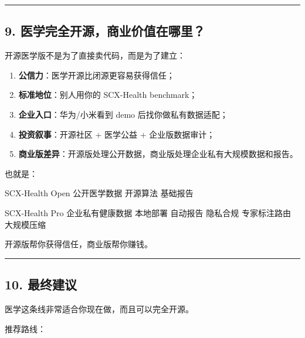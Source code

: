 \documentclass[
  12pt,
]{ctexart}
\newenvironment{Shaded}{}{}
\newcommand{\NormalTok}[1]{#1}
\providecommand{\tightlist}{%
  \setlength{\itemsep}{0pt}\setlength{\parskip}{0pt}}
\begin{document}
\begin{center}\rule{0.5\linewidth}{0.5pt}\end{center}

\subsection{9.
医学完全开源，商业价值在哪里？}\label{ux533bux5b66ux5b8cux5168ux5f00ux6e90ux5546ux4e1aux4ef7ux503cux5728ux54eaux91cc}

开源医学版不是为了直接卖代码，而是为了建立：

\begin{enumerate}
\def\labelenumi{\arabic{enumi}.}
\tightlist
\item
  \textbf{公信力}：医学开源比闭源更容易获得信任；
\item
  \textbf{标准地位}：别人用你的 SCX-Health benchmark；
\item
  \textbf{企业入口}：华为/小米看到 demo 后找你做私有数据适配；
\item
  \textbf{投资叙事}：开源社区 + 医学公益 + 企业版数据审计；
\item
  \textbf{商业版差异}：开源版处理公开数据，商业版处理企业私有大规模数据和报告。
\end{enumerate}

也就是：

\begin{Shaded}
\begin{Highlighting}[]
\NormalTok{SCX{-}Health Open}
\NormalTok{  公开医学数据}
\NormalTok{  开源算法}
\NormalTok{  基础报告}

\NormalTok{SCX{-}Health Pro}
\NormalTok{  企业私有健康数据}
\NormalTok{  本地部署}
\NormalTok{  自动报告}
\NormalTok{  隐私合规}
\NormalTok{  专家标注路由}
\NormalTok{  大规模压缩}
\end{Highlighting}
\end{Shaded}

开源版帮你获得信任，商业版帮你赚钱。

\begin{center}\rule{0.5\linewidth}{0.5pt}\end{center}

\subsection{10. 最终建议}\label{ux6700ux7ec8ux5efaux8bae-3}

医学这条线非常适合你现在做，而且可以完全开源。

推荐路线：
\end{document}
